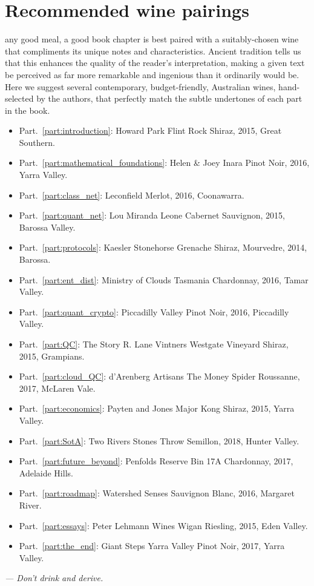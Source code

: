 \section*{Recommended wine pairings}

 any good meal, a good book chapter is best paired with a suitably-chosen wine that compliments its unique notes and characteristics. Ancient tradition tells us that this enhances the quality of the reader's interpretation, making a given text be perceived as far more remarkable and ingenious than it ordinarily would be. Here we suggest several contemporary, budget-friendly, Australian wines, hand-selected by the authors, that perfectly match the subtle undertones of each part in the book.

\begin{itemize}
	\item Part.~\ref{part:introduction}: Howard Park Flint Rock Shiraz, 2015, Great Southern.
	\item Part.~\ref{part:mathematical_foundations}: Helen \& Joey Inara Pinot Noir, 2016, Yarra Valley.
	\item Part.~\ref{part:class_net}: Leconfield Merlot, 2016, Coonawarra.
	\item Part.~\ref{part:quant_net}: Lou Miranda Leone Cabernet Sauvignon, 2015, Barossa Valley.
	\item Part.~\ref{part:protocols}: Kaesler Stonehorse Grenache Shiraz, Mourvedre, 2014, Barossa.
	\item Part.~\ref{part:ent_dist}: Ministry of Clouds Tasmania Chardonnay, 2016, Tamar Valley.
	\item Part.~\ref{part:quant_crypto}: Piccadilly Valley Pinot Noir, 2016, Piccadilly Valley.
	\item Part.~\ref{part:QC}: The Story R. Lane Vintners Westgate Vineyard Shiraz, 2015, Grampians.
	\item Part.~\ref{part:cloud_QC}: d'Arenberg Artisans The Money Spider Roussanne, 2017, McLaren Vale.
	\item Part.~\ref{part:economics}: Payten and Jones Major Kong Shiraz, 2015, Yarra Valley.
	\item Part.~\ref{part:SotA}: Two Rivers Stones Throw Semillon, 2018, Hunter Valley.
	\item Part.~\ref{part:future_beyond}: Penfolds Reserve Bin 17A Chardonnay, 2017, Adelaide Hills.
	\item Part.~\ref{part:roadmap}: Watershed Senses Sauvignon Blanc, 2016, Margaret River.
	\item Part.~\ref{part:essays}: Peter Lehmann Wines Wigan Riesling, 2015, Eden Valley.
	\item Part.~\ref{part:the_end}: Giant Steps Yarra Valley Pinot Noir, 2017, Yarra Valley.
\end{itemize}

\textit{--- Don't drink and derive.}


